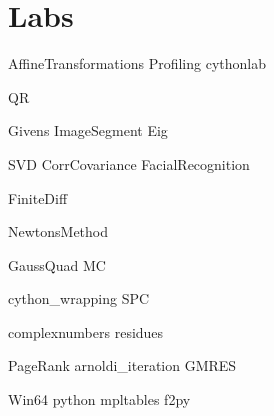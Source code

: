 \documentclass[nociteref]{SIAM-GH-book}
\begin{document}
\part{Labs}
{AffineTransformations}
{Profiling}
{cythonlab}

{QR}


{Givens}
{ImageSegment}
{Eig}


{SVD}
{CorrCovariance}
{FacialRecognition}

{FiniteDiff}

{NewtonsMethod}


{GaussQuad}
{MC}

{cython_wrapping}
{SPC}

{complexnumbers}
{residues}

{PageRank}
{arnoldi_iteration}
{GMRES}


\begin{appendices}
{Win64}
{python}
{mpltables}
{f2py}
\end{appendices}
\end{document}
